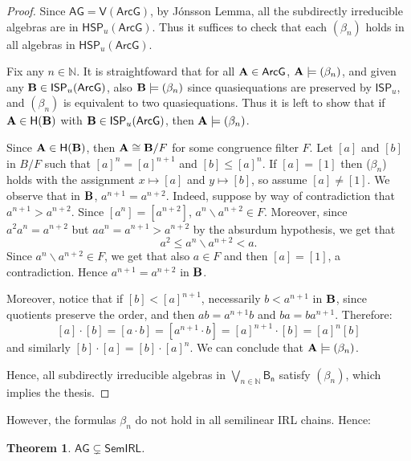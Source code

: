 \documentclass{amsart}
\newtheorem{theorem}{Theorem}[section]
\theoremstyle{definition}
\numberwithin{equation}{section}
\newcommand{\alg}[1]{{\textbf{\upshape #1}}}  %
\newcommand{\vv}[1]{\mathsf {#1}}
\newcommand{\BlockG}{\vv{ArcG}}
\newcommand{\BG}{\vv{AG}}
\begin{document}
\begin{proof}
Since $\BG = \vv V(\BlockG)$, by J\'onsson Lemma, all the subdirectly irreducible algebras are in $\mathsf{HSP}_u(\BlockG)$. Thus it suffices to check that each $(\beta_n)$ holds in all algebras in $\mathsf{HSP}_u(\BlockG)$. 

Fix any $n \in \mathbb{N}$. It is straightfoward that for all $\alg A \in \BlockG$, $\alg A \models (\beta_n)$, and given any $\alg B \in \mathsf{ISP}_u(\BlockG)$, also $\alg B \models (\beta_n)$ since quasiequations are preserved by $\mathsf{ISP}_u$, and $(\beta_n)$ is equivalent to two quasiequations. Thus it is left to show that if  $\alg A \in \mathsf{H}(\alg B)$ with $\alg B \in \mathsf{ISP}_u(\BlockG)$, then $\alg A \models (\beta_n)$.

Since $\alg A \in \mathsf{H}(\alg B)$, then $\alg A \cong \alg B / F$ for some congruence filter $F$. 
Let $[a]$ and $[b]$ in $B/F$ such that $[a]^n=[a]^{n+1}$ and $[b] \leq [a]^n$. If $[a] = [1]$ then ($\beta_n$) holds with the assignment $x \mapsto [a]$ and $y \mapsto [b]$, so assume $[a] \neq [1]$. We observe that in $\alg B$, $a^{n + 1} = a^{n+2}$. Indeed, suppose by way of contradiction that $a^{n+1}> a^{n+2}$.  Since $[a^n]=[a^{n+2}]$, $a^n \backslash a^{n+2} \in F$. Moreover,
since $a^2 a^n = a^{n+2}$ but $a a^n = a^{n+1} > a^{n+2}$ by the absurdum hypothesis, we get that
 $$a^{2}\leq a^n\backslash a^{n+2}<a.$$ Since $a^n \backslash a^{n+2} \in F$, we get that also $a \in F$ and then $[a] = [1]$, a contradiction. Hence $a^{n + 1} = a^{n+2}$ in $\alg B$.
 
 Moreover, notice that if $[b] < [a]^{n+1}$, necessarily $b < a^{n +1}$ in $\alg B$, since quotients preserve the order, and then $a b = a^{n+1}b$ and $ba = ba^{n+1}$.  
Therefore: $$[a] \cdot [b] = [a \cdot b]=[a^{n+1} \cdot b]= [a]^{n+1} \cdot [b] = [a]^n [b]$$ and similarly $[b] \cdot [a] =[b] \cdot [a]^n$. We can conclude that $\alg A \models (\beta_n)$. 

Hence, all subdirectly irreducible algebras in $\bigvee_{n \in \mathbb{N}} \vv{B_n}$ satisfy $(\beta_n)$, which implies the thesis.
\end{proof}
However, the formulas $\beta_n$ do not hold in all semilinear IRL chains. Hence:
\begin{theorem}\label{theorem: not all SemIRL}
	$\BG \subsetneq \vv{SemIRL}$.
\end{theorem}
\end{document}
